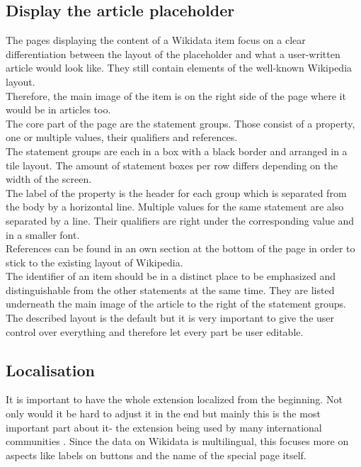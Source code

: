 \subsection{Display the article placeholder}
The pages displaying the content of a Wikidata item focus on a clear differentiation between the layout of the placeholder and what a user-written article would look like. They still contain elements of the well-known Wikipedia layout. \\
Therefore, the main image of the item is on the right side of the page where it would be in articles too.\\
The core part of the page are the statement groups. Those consist of a property, one or multiple values, their qualifiers and references. \\
The statement groups are each in a box with a black border and arranged in a tile layout. The amount of statement boxes per row differs depending on the width of the screen. \\
The label of the property is the header for each group which is separated from the body by a horizontal line. Multiple values for the same statement are also separated by a line. Their qualifiers are right under the corresponding value and in a smaller font. \\
References can be found in an own section at the bottom of the page in order to stick to the existing layout of Wikipedia. \\
The identifier of an item should be in a distinct place to be emphasized and distinguishable from the other statements at the same time. They are listed underneath the main image of the article to the right of the statement groups. \\
The described layout is the default but it is very important to give the user control over everything and therefore let every part be user editable. \\

\subsection{Localisation}
It is important to have the whole extension localized from the beginning. Not only would it be hard to adjust it in the end but mainly this is the most important part about it- the extension being used by many international communities%
. Since the data on Wikidata is multilingual, this focuses more on aspects like labels on buttons and the name of the special page itself. \\

